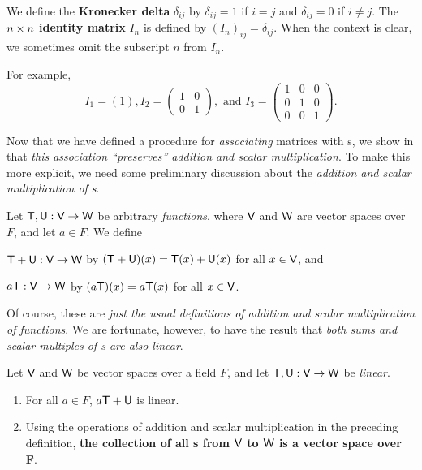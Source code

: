 \begin{definition} \label{def 2.7}
We define the \textbf{Kronecker delta} \(\delta_{ij}\) by \(\delta_{ij} = 1\) if \(i = j\) and \(\delta_{ij} = 0\) if \(i \ne j\).
The \(n \times n\) \textbf{identity matrix} \(I_n\) is defined by \((I_n)_{ij} = \delta_{ij}\).
When the context is clear, we sometimes omit the subscript \(n\) from \(I_n\).

For example,
\[
    I_1 = (1), I_2 = \begin{pmatrix} 1 & 0 \\ 0 & 1 \end{pmatrix}, 
    \text{ and } I_3 = \begin{pmatrix} 1 & 0 & 0 \\ 0 & 1 & 0 \\ 0 & 0 & 1 \end{pmatrix}.
\]
\end{definition}

Now that we have defined a procedure for \emph{associating} matrices with \LTRAN{}s, we show in  that \emph{this association ``preserves'' addition and scalar multiplication}.
To make this more explicit, we need some preliminary discussion about the \emph{addition and scalar multiplication of \LTRAN{}s}.

\begin{definition} \label{def 2.8}
Let \(\textsf{T}, \textsf{U}: \textsf{V} \to \textsf{W}\) be arbitrary \emph{functions}, where \(\textsf{V}\) and \(\textsf{W}\) are vector spaces over \(F\), and let \(a \in F\).
We define

 \(\textsf{T} + \textsf{U} : \textsf{V} \to \textsf{W}\) by \((\textsf{T} + \textsf{U})(x) = \textsf{T}(x) + \textsf{U}(x)\) for all \(x \in \textsf{V}\), and

 \(a\textsf{T}: \textsf{V} \to \textsf{W}\) by \((a\textsf{T})(x) = a\textsf{T}(x)\) for all \(x \in \textsf{V}\).
\end{definition}

\begin{note}
Of course, these are \emph{just the usual definitions of addition and scalar multiplication of functions}.
We are fortunate, however, to have the result that \emph{both sums and scalar multiples of \LTRAN{}s are also linear}.
\end{note}

\begin{theorem} \label{thm 2.7}
Let \(\textsf{V}\) and \(\textsf{W}\) be vector spaces over a field \(F\), and let \(\textsf{T}, \textsf{U}: \textsf{V} \to \textsf{W}\) be \emph{linear}.
\begin{enumerate}
\item For all \(a \in F\), \(a\textsf{T} + \textsf{U}\) is linear.
\item Using the operations of addition and scalar multiplication in the preceding definition, \textbf{the collection of all \LTRAN{}s from \(\textsf{V}\) to \(\textsf{W}\) is a vector space over F}.
\end{enumerate}
\end{theorem}

